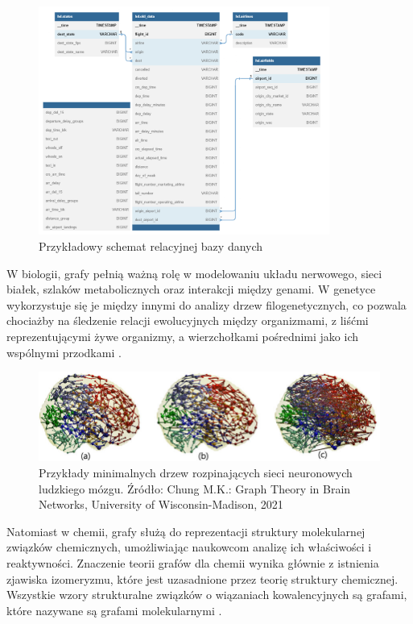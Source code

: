 \begin{figure}[ht]
	\centering
	\includegraphics[height=7.5cm]{partials/images/intro_database.png}
	\caption{Przykładowy schemat relacyjnej bazy danych}
    \label{Fig:intro-2}
\end{figure}

W biologii, grafy pełnią ważną rolę w modelowaniu układu nerwowego, sieci białek,
szlaków metabolicznych oraz interakcji między genami.
W genetyce wykorzystuje się je między innymi do analizy drzew filogenetycznych,
co pozwala chociażby na śledzenie relacji ewolucyjnych między organizmami,
z liśćmi reprezentującymi żywe organizmy, a wierzchołkami pośrednimi jako ich wspólnymi przodkami \cite{Erciyes2023}.

\begin{figure}[ht]
	\centering
	\includegraphics[width=12cm]{partials/images/intro_brain.png}
	\caption{Przykłady minimalnych drzew rozpinających sieci neuronowych ludzkiego mózgu.
		Źródło: Chung M.K.: Graph Theory in Brain Networks, University of Wisconsin-Madison, 2021}
    \label{Fig:intro-3}
\end{figure}

Natomiast w chemii, grafy służą do reprezentacji struktury molekularnej związków chemicznych,
umożliwiając naukowcom analizę ich właściwości i reaktywności.
Znaczenie teorii grafów dla chemii wynika głównie z istnienia zjawiska izomeryzmu,
które jest uzasadnione przez teorię struktury chemicznej.
Wszystkie wzory strukturalne związków o wiązaniach kowalencyjnych są grafami,
które nazywane są grafami molekularnymi \cite{Balaban1985}.

